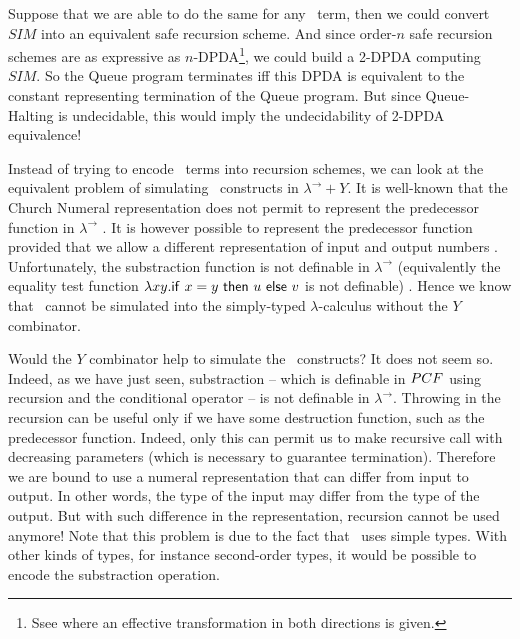 \documentclass{article}
\begin{document}
Suppose that we are able to do the same for any \pcf\ term, then we
could convert $SIM$ into an equivalent safe recursion scheme. And
since order-$n$ safe recursion schemes are as expressive as
$n$-DPDA\footnote{Ssee \cite{KNU02} where an effective
transformation in both directions is given.}, we could build a
2-DPDA computing $SIM$. So the Queue program terminates iff
this DPDA is equivalent to the constant representing termination of the Queue program. But since Queue-Halting is undecidable, this would
imply the undecidability of 2-DPDA equivalence!



Instead of trying to encode  \pcf\ terms into recursion schemes, we
can look at the equivalent problem of simulating \pcf\ constructs in
$\lambda^\rightarrow + Y$. It is well-known that the Church Numeral
representation does not permit to represent the predecessor function
in $\lambda^\rightarrow$ \cite{DBLP:journals/jacm/FortuneLO83}. It
is however possible to represent the predecessor function provided
that we allow a different representation of input and output numbers
\cite{DBLP:journals/jacm/FortuneLO83}. Unfortunately, the
substraction function is not definable in $\lambda^\rightarrow$
(equivalently  the equality test function $\lambda xy. {\sf if\ } x
= y {\sf\ then\ } u {\sf\ else\ } v$ is not definable)
\cite{DBLP:journals/jacm/FortuneLO83}. Hence we know that \pcf\
cannot be simulated into the simply-typed $\lambda$-calculus without
the $Y$ combinator.

Would the $Y$ combinator help to simulate the \pcf\ constructs? It
does not seem so. Indeed, as we have just seen, substraction --
which is definable in ${PCF}$ using recursion and the conditional
operator -- is not definable in $\lambda^\rightarrow$. Throwing in
the recursion can be useful only if we have some destruction
function, such as the predecessor function. Indeed, only this can
permit us to make recursive call with decreasing parameters (which
is necessary to guarantee termination). Therefore we are bound to
use a numeral representation that can differ from input to output.
In other words, the type of the input may differ from the type of
the output. But with such difference in the representation,
recursion cannot be used anymore! Note that this problem is due to
the fact that \pcf\ uses simple types. With other kinds of types,
for instance second-order types, it would be possible to encode the
substraction operation.
\end{document}
